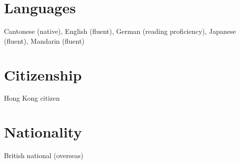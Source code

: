 \documentclass[margin,line,pifont,palatino,courier]{res}
\begin{document}
\begin{resume}
\section{\sc Languages}
Cantonese (native), English (fluent), German (reading proficiency), Japanese (fluent), Mandarin (fluent)

\section{\sc Citizenship}
Hong Kong citizen

\section{\sc Nationality}
British national (overseas)


\end{resume}
\end{document}
